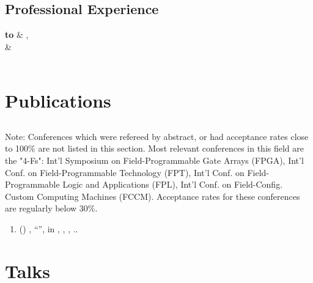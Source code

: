 \documentclass[10pt, oneside]{article}
\begin{document}
\begin{center}
\section*{Professional Experience}
  \textbf{ to}      & \textbf{}, \emph{} \\
  \textbf{} &  \\
  \\
    
\end{center}
  

\section*{Publications}
  \subsection*{}
    Note:  Conferences which were refereed by abstract, or had acceptance rates close to 100\% are not listed in this section.  Most relevant conferences in this field are the "4-Fs": Int'l Symposium on Field-Programmable Gate Arrays (FPGA), Int'l Conf. on Field-Programmable Technology (FPT), Int'l Conf. on Field-Programmable Logic and Applications (FPL), Int'l Conf. on Field-Config. Custom Computing Machines (FCCM).  Acceptance rates for these conferences are regularly below 30\%. 

  \begin{enumerate}[resume]
      \item {}(\textit{}) , ``'', in , , , .\textbf{}.
  \end{enumerate}


\section*{Talks}
\end{document}
